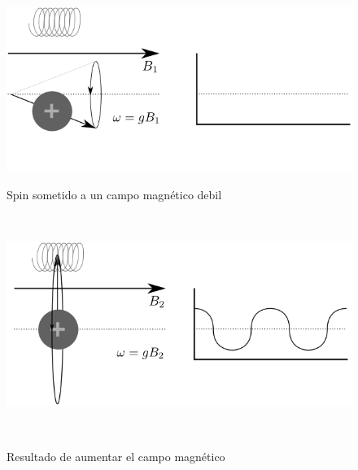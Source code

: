 \begin{figure}[h!]

\begin{minipage}[b]{0.49\textwidth}
    \includegraphics[width=\textwidth]{img/spin0.png}
    \caption{Spin sometido a un campo magn\'etico debil}
    \label{fig:nosignal}
\end{minipage} ~ %
\hfill
\begin{minipage}[b]{0.49\textwidth}
    \includegraphics[width=\textwidth]{img/spin1.png}
    \caption{Resultado de aumentar el campo magn\'etico}
    \label{fig:signal}    
\end{minipage} ~ %

\end{figure}

